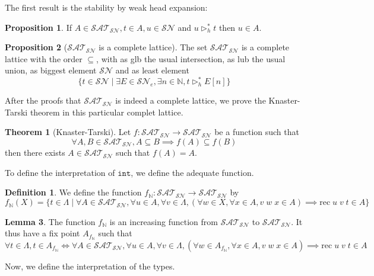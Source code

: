 \documentclass{article}
\newcommand{\SN}[0]{\mathcal{SN}}
\renewcommand{\int}[0]{\texttt{int}}
\newcommand{\rec}[0]{\mathrm{rec}}
\newcommand{\bN}[0]{\mathbb N}
\newcommand{\SAT}[0]{\mathcal{SAT}_{\mathcal{SN}}}
\theoremstyle{definition}
\newtheorem{defi}{Definition}
\newtheorem{them}{Theorem}
\newtheorem{prop}{Proposition}[subsection]
\newtheorem{lem}[prop]{Lemma}
\begin{document}
The first result is the stability by weak head expansion: 

\begin{prop}
    If $A\in \SAT,t\in A,u\in\SN$ and $u\rhd_h^* t$ then $u\in A$.
\end{prop}

\begin{prop}[$\SAT$ is a complete lattice]
    The set $\SAT$ is a complete lattice with the order $\subseteq$, with as glb the usual intersection, as
    lub the usual union, as biggest element $\SN$ and as least element
    $$\{ t \in \SN\mid \exists E \in \SN_e, \exists n \in \bN, t \rhd_h^* E[n]\}$$
\end{prop}

After the proofs that $\SAT$ is indeed a complete lattice, we prove the Knaster-Tarski theorem in this
particular complet lattice.

\begin{them}[Knaster-Tarski]
    Let $f : \SAT \to \SAT$ be a function such that
    $$\forall A,B\in\SAT, A\subseteq B \implies f(A)\subseteq f(B)$$
    then there exists $A \in \SAT$ such that $f(A) = A$.
\end{them}

To define the interpretation of $\int$, we define the adequate function.

\begin{defi}
    We define the function $f_\bN : \SAT \to \SAT$ by
    $$f_\bN(X) = \{ t \in \Lambda \mid \forall A \in \SAT, \forall u\in A, \forall v\in \Lambda,
    (\forall w \in X, \forall x \in A, v\;w\;x\in A) \implies \rec\;u\;v\;t\in A\}$$
\end{defi}

\begin{lem}
    The function $f_\bN$ is an increasing function from $\SAT$ to $\SAT$. It thus have a fix point
    $A_{f_\bN}$ such that
    $$\forall t \in \Lambda, t \in A_{f_\bN} \iff \forall A \in \SAT, \forall u \in A, \forall v \in
    \Lambda, (\forall w \in A_{f_\bN}, \forall x \in A, v \;w\;x\in A) \implies \rec\;u\;v\;t\in A$$
\end{lem}

Now, we define the interpretation of the types.
\end{document}
